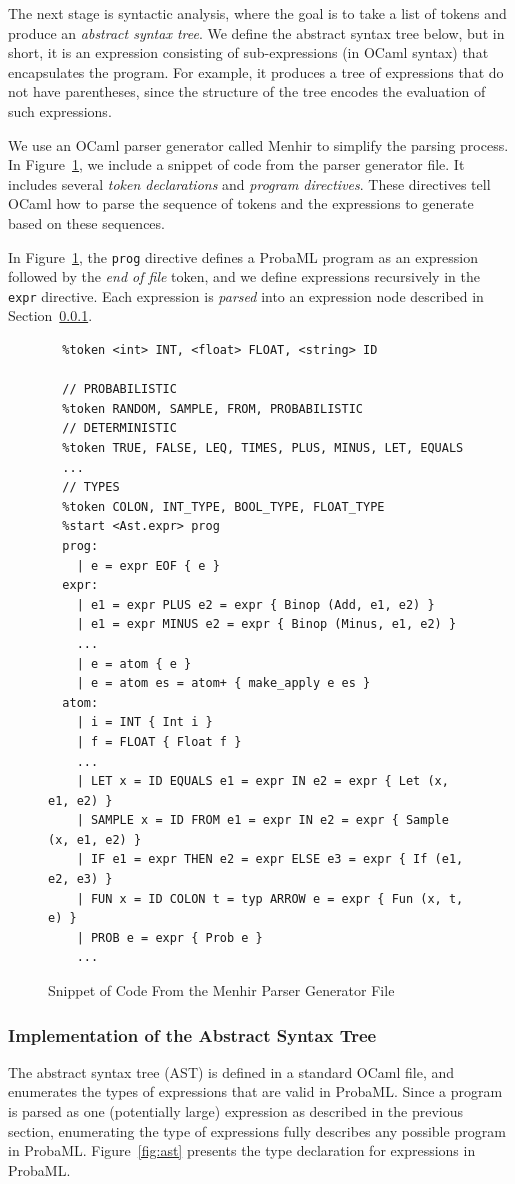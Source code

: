 \documentclass[pageno]{jpaper}
\begin{document}
The next stage is syntactic analysis, where the goal is to take a list of tokens and produce an \emph{abstract syntax tree}. We define the abstract syntax tree below, but in short, it is an expression consisting of sub-expressions (in OCaml syntax) that encapsulates the program. For example, it produces a tree of expressions that do not have parentheses, since the structure of the tree encodes the evaluation of such expressions.

We use an OCaml parser generator called Menhir to simplify the parsing process. In Figure~\ref{fig:parser}, we include a snippet of code from the parser generator file. It includes several \emph{token declarations} and \emph{program directives}. These directives tell OCaml how to parse the sequence of tokens and the expressions to generate based on these sequences.

In Figure~\ref{fig:parser}, the \texttt{prog} directive defines a ProbaML program as an expression followed by the \emph{end of file} token, and we define expressions recursively in the \texttt{expr} directive. Each expression is \emph{parsed} into an expression node described in Section~\ref{ast}.

\begin{figure}[hbt]
  \begin{verbatim}
  %token <int> INT, <float> FLOAT, <string> ID

  // PROBABILISTIC
  %token RANDOM, SAMPLE, FROM, PROBABILISTIC
  // DETERMINISTIC
  %token TRUE, FALSE, LEQ, TIMES, PLUS, MINUS, LET, EQUALS
  ...
  // TYPES
  %token COLON, INT_TYPE, BOOL_TYPE, FLOAT_TYPE
  %start <Ast.expr> prog
  prog:
    | e = expr EOF { e }
  expr:
    | e1 = expr PLUS e2 = expr { Binop (Add, e1, e2) }
    | e1 = expr MINUS e2 = expr { Binop (Minus, e1, e2) }
    ...
    | e = atom { e }
    | e = atom es = atom+ { make_apply e es }
  atom:
    | i = INT { Int i }
    | f = FLOAT { Float f }
    ...
    | LET x = ID EQUALS e1 = expr IN e2 = expr { Let (x, e1, e2) }
    | SAMPLE x = ID FROM e1 = expr IN e2 = expr { Sample (x, e1, e2) }
    | IF e1 = expr THEN e2 = expr ELSE e3 = expr { If (e1, e2, e3) }
    | FUN x = ID COLON t = typ ARROW e = expr { Fun (x, t, e) }
    | PROB e = expr { Prob e }
    ...
\end{verbatim}
  \caption{Snippet of Code From the Menhir Parser Generator File}
  \label{fig:parser}
\end{figure}

\subsubsection{Implementation of the Abstract Syntax Tree} \label{ast}
The abstract syntax tree (AST) is defined in a standard OCaml file, and enumerates the types of expressions that are valid in ProbaML. Since a program is parsed as one (potentially large) expression as described in the previous section, enumerating the type of expressions fully describes any possible program in ProbaML. Figure~\ref{fig:ast} presents the type declaration for expressions in ProbaML.
\end{document}
